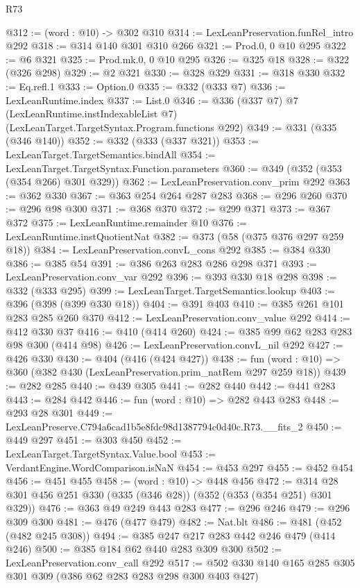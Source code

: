 \begin{lexlean}{R73}
\begin{coremodule}
@312 := (word : @10) -> @302 @310
@314 := LexLeanPreservation.funRel_intro @292
@318 := @314 @140 @301 @310 @266
@321 := Prod.{0, 0} @10 @295
@322 := @6 @321
@325 := Prod.mk.{0, 0} @10 @295
@326 := @325 @18
@328 := @322 (@326 @298)
@329 := @2 @321
@330 := @328 @329
@331 := @318 @330
@332 := Eq.refl.{1}
@333 := Option.{0}
@335 := @332 (@333 @7)
@336 := LexLeanRuntime.index
@337 := List.{0}
@346 := @336
    (@337 @7)
    @7
    (LexLeanRuntime.instIndexableList @7)
    (LexLeanTarget.TargetSyntax.Program.functions @292)
@349 := @331 (@335 (@346 @140))
@352 := @332 (@333 (@337 @321))
@353 := LexLeanTarget.TargetSemantics.bindAll
@354 := LexLeanTarget.TargetSyntax.Function.parameters
@360 := @349 (@352 (@353 (@354 @266) @301 @329))
@362 := LexLeanPreservation.conv_prim @292
@363 := @362 @330
@367 := @363 @254 @264 @287 @283
@368 := @296 @260
@370 := @296 @98 @300
@371 := @368 @370
@372 := @299 @371
@373 := @367 @372
@375 := LexLeanRuntime.remainder @10
@376 := LexLeanRuntime.instQuotientNat
@382 := @373 (@58 (@375 @376 @297 @259 @18))
@384 := LexLeanPreservation.convL_cons @292
@385 := @384 @330
@386 := @385 @54
@391 := @386 @263 @283 @286 @298 @371
@393 := LexLeanPreservation.conv_var @292
@396 := @393 @330 @18 @298
@398 := @332 (@333 @295)
@399 := LexLeanTarget.TargetSemantics.lookup
@403 := @396 (@398 (@399 @330 @18))
@404 := @391 @403
@410 := @385 @261 @101 @283 @285 @260 @370
@412 := LexLeanPreservation.conv_value @292
@414 := @412 @330 @37
@416 := @410 (@414 @260)
@424 := @385 @99 @62 @283 @283 @98 @300 (@414 @98)
@426 := LexLeanPreservation.convL_nil @292
@427 := @426 @330
@430 := @404 (@416 (@424 @427))
@438 := fun (word : @10) => @360 (@382 @430 (LexLeanPreservation.prim_natRem @297 @259 @18))
@439 := @282 @285
@440 := @439 @305
@441 := @282 @440
@442 := @441 @283
@443 := @284 @442
@446 := fun (word : @10) => @282 @443 @283
@448 := @293 @28 @301
@449 := LexLeanPreserve.C794a6cad1b5e8fdc98d1387794c0d40c.R73.__fits_2
@450 := @449 @297
@451 := @303 @450
@452 := LexLeanTarget.TargetSyntax.Value.bool
@453 := VerdantEngine.WordComparison.isNaN
@454 := @453 @297
@455 := @452 @454
@456 := @451 @455
@458 := (word : @10) -> @448 @456
@472 := @314 @28 @301 @456 @251 @330 (@335 (@346 @28)) (@352 (@353 (@354 @251) @301 @329))
@476 := @363 @49 @249 @443 @283
@477 := @296 @246
@479 := @296 @309 @300
@481 := @476 (@477 @479)
@482 := Nat.blt
@486 := @481 (@452 (@482 @245 @308))
@494 := @385 @247 @217 @283 @442 @246 @479 (@414 @246)
@500 := @385 @184 @62 @440 @283 @309 @300
@502 := LexLeanPreservation.conv_call @292
@517 := @502 @330 @140 @165 @285 @305 @301 @309 (@386 @62 @283 @283 @298 @300 @403 @427)

\end{coremodule}
\end{lexlean}
